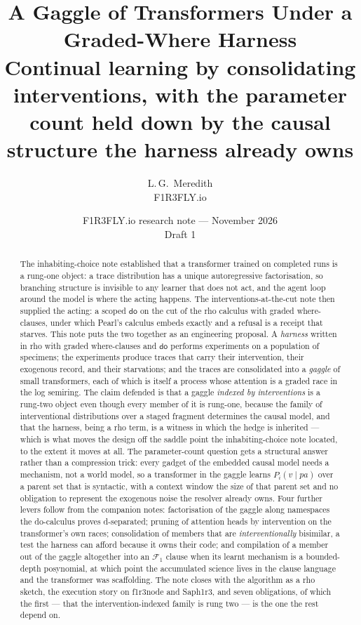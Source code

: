 \documentclass[11pt]{article}
\title{\bfseries A Gaggle of Transformers Under a Graded-Where Harness\\[4pt]
\large Continual learning by consolidating interventions, with the parameter
count held down by the causal structure the harness already owns}
\author{L.\,G.\ Meredith\\ \small F1R3FLY.io}
\date{F1R3FLY.io research note --- November 2026\\[2pt]\normalsize Draft 1}
\theoremstyle{plain}
\theoremstyle{definition}
\theoremstyle{remark}
\newcommand{\dok}{\textsf{do}}
\begin{document}
\maketitle

\begin{abstract}
The inhabiting-choice note established that a transformer trained on completed
runs is a rung-one object: a trace distribution has a unique autoregressive
factorisation, so branching structure is invisible to any learner that does
not act, and the agent loop around the model is where the acting happens. The
interventions-at-the-cut note then supplied the acting: a scoped $\dok$ on the
cut of the rho calculus with graded where-clauses, under which Pearl's calculus
embeds exactly and a refusal is a receipt that starves. This note puts the two
together as an engineering proposal. A \emph{harness} written in rho with
graded where-clauses and $\dok$ performs experiments on a population of
specimens; the experiments produce traces that carry their intervention, their
exogenous record, and their starvations; and the traces are consolidated into a
\emph{gaggle} of small transformers, each of which is itself a process whose
attention is a graded race in the log semiring. The claim defended is that a
gaggle \emph{indexed by interventions} is a rung-two object even though every
member of it is rung-one, because the family of interventional distributions
over a staged fragment determines the causal model, and that the harness,
being a rho term, is a witness in which the hedge is inherited --- which is
what moves the design off the saddle point the inhabiting-choice note located,
to the extent it moves at all. The parameter-count question gets a structural
answer rather than a compression trick: every gadget of the embedded causal
model needs a mechanism, not a world model, so a transformer in the gaggle
learns $P_i(v \mid \mathit{pa})$ over a parent set that is syntactic, with a
context window the size of that parent set and no obligation to represent the
exogenous noise the resolver already owns. Four further levers follow from the
companion notes: factorisation of the gaggle along namespaces the do-calculus
proves d-separated; pruning of attention heads by intervention on the
transformer's own races; consolidation of members that are \emph{interventionally}
bisimilar, a test the harness can afford because it owns their code; and
compilation of a member out of the gaggle altogether into an $\mathcal{F}_1$
clause when its learnt mechanism is a bounded-depth posynomial, at which point
the accumulated science lives in the clause language and the transformer was
scaffolding. The note closes with the algorithm as a rho sketch, the execution
story on f1r3node and Saph1r3, and seven obligations, of which the first ---
that the intervention-indexed family is rung two --- is the one the rest
depend on.
\end{abstract}
\end{document}
